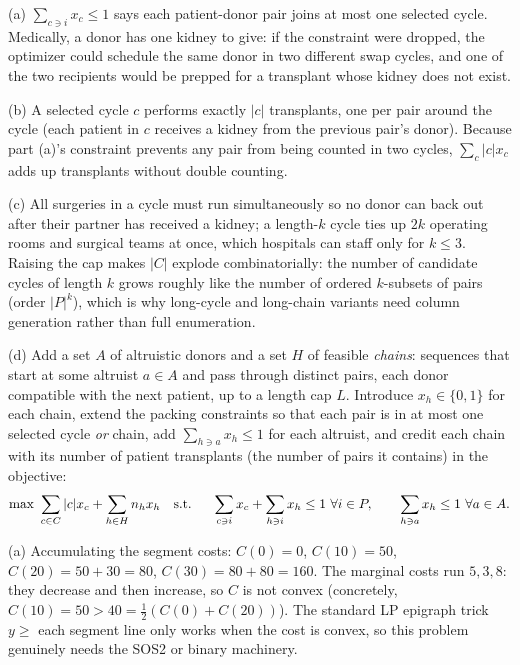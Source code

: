 
(a) $\sum_{c \ni i} x_c \leq 1$ says each patient-donor pair joins at most one selected cycle. Medically, a donor has one kidney to give: if the constraint were dropped, the optimizer could schedule the same donor in two different swap cycles, and one of the two recipients would be prepped for a transplant whose kidney does not exist.

(b) A selected cycle $c$ performs exactly $|c|$ transplants, one per pair around the cycle (each patient in $c$ receives a kidney from the previous pair's donor). Because part (a)'s constraint prevents any pair from being counted in two cycles, $\sum_c |c| x_c$ adds up transplants without double counting.

(c) All surgeries in a cycle must run simultaneously so no donor can back out after their partner has received a kidney; a length-$k$ cycle ties up $2k$ operating rooms and surgical teams at once, which hospitals can staff only for $k \leq 3$. Raising the cap makes $|C|$ explode combinatorially: the number of candidate cycles of length $k$ grows roughly like the number of ordered $k$-subsets of pairs (order $|P|^k$), which is why long-cycle and long-chain variants need column generation rather than full enumeration.

(d) Add a set $A$ of altruistic donors and a set $H$ of feasible \emph{chains}: sequences that start at some altruist $a \in A$ and pass through distinct pairs, each donor compatible with the next patient, up to a length cap $L$. Introduce $x_h \in \{0,1\}$ for each chain, extend the packing constraints so that each pair is in at most one selected cycle \emph{or} chain, add $\sum_{h \ni a} x_h \leq 1$ for each altruist, and credit each chain with its number of patient transplants (the number of pairs it contains) in the objective:
\[
\max\ \sum_{c \in C} |c|x_c + \sum_{h \in H} n_h x_h
\quad \text{s.t.}\;\;\quad
\sum_{c \ni i} x_c + \sum_{h \ni i} x_h \leq 1 \ \forall i \in P,\qquad
\sum_{h \ni a} x_h \leq 1 \ \forall a \in A.
\]


(a) Accumulating the segment costs: $C(0) = 0$, $C(10) = 50$, $C(20) = 50 + 30 = 80$, $C(30) = 80 + 80 = 160$. The marginal costs run $5, 3, 8$: they decrease and then increase, so $C$ is not convex (concretely, $C(10) = 50 > 40 = \tfrac{1}{2}(C(0) + C(20))$). The standard LP epigraph trick $y \geq$ each segment line only works when the cost is convex, so this problem genuinely needs the SOS2 or binary machinery.

